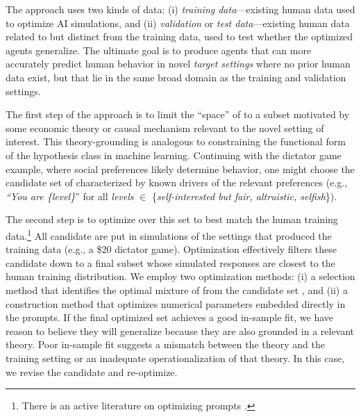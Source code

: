 The approach uses two kinds of data: (i) \emph{training data}---existing human data used to optimize AI simulations, and (ii) \emph{validation} or \emph{test data}---existing human data related to but distinct from the training data, used to test whether the optimized agents generalize.
The ultimate goal is to produce agents that can more accurately predict human behavior in novel \emph{target settings} where no prior human data exist, but that lie in the same broad domain as the training and validation settings.

The first step of the approach is to limit the ``space'' of  to a subset motivated by some economic theory or causal mechanism relevant to the novel setting of interest.
This theory-grounding is analogous to constraining the functional form of the hypothesis class in machine learning.
Continuing with the dictator game example, where social preferences likely determine behavior, one might choose the candidate set of  characterized by known drivers of the relevant preferences (e.g., \emph{``You are \{level\}}'' for all \emph{levels} $\in$ \{\emph{self-interested but fair, altruistic, selfish}\}).

The second step is to optimize over this set to best match the human training data.\footnote{There is an active literature on optimizing prompts \citep{khattab2024dspy}.}
All candidate  are put in simulations of the settings that produced the training data (e.g., a \$20 dictator game).
Optimization effectively filters these candidate  down to a final subset whose simulated responses are closest to the human training distribution.
We employ two optimization methods: (i) a selection method that identifies the optimal mixture of  from the candidate set \citep{leng2024calibrate,Jackson2025Mixture,bui2025mixture}, and (ii) a construction method that optimizes numerical parameters embedded directly in the prompts.
If the final optimized set achieves a good in-sample fit, we have reason to believe they will generalize because they are also grounded in a relevant theory.
Poor in-sample fit suggests a mismatch between the theory and the training setting or an inadequate operationalization of that theory.
In this case, we revise the candidate  and re-optimize.

